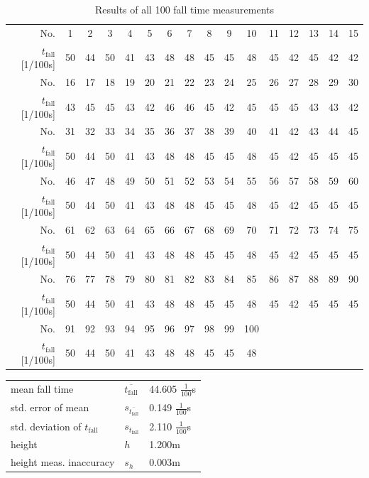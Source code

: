 \documentclass{scrreprt}
\begin{document}
\begin{table}[H]
\center
    \begin{tabular}{|r||ccccccccccccccc|}
    \hline
                          No. & 1  & 2  & 3  & 4  & 5  & 6  & 7  & 8  & 9  & 10 & 11 & 12 & 13 & 14 & 15\\
    $t_{\text{fall}}$[1/100s] & 50 & 44 & 50 & 41 & 43 & 48 & 48 & 45 & 45 & 48 & 45 & 42 & 45 & 42 & 42\\
    \hline 
                          No. & 16 & 17 & 18 & 19 & 20 & 21 & 22 & 23 & 24 & 25 & 26 & 27 & 28 & 29 & 30\\
    $t_{\text{fall}}$[1/100s] & 43 & 45 & 45 & 43 & 42 & 46 & 46 & 45 & 42 & 45 & 45 & 45 & 43 & 43 & 42\\
    \hline
                          No. & 31 & 32 & 33 & 34 & 35 & 36 & 37 & 38 & 39 & 40 & 41 & 42 & 43 & 44 & 45\\
    $t_{\text{fall}}$[1/100s] & 50 & 44 & 50 & 41 & 43 & 48 & 48 & 45 & 45 & 48 & 45 & 42 & 45 & 45 & 45\\
    \hline                     
                          No. & 46 & 47 & 48 & 49 & 50 & 51 & 52 & 53 & 54 & 55 & 56 & 57 & 58 & 59 & 60\\
    $t_{\text{fall}}$[1/100s] & 50 & 44 & 50 & 41 & 43 & 48 & 48 & 45 & 45 & 48 & 45 & 42 & 45 & 45 & 45\\
    \hline                     
                          No. & 61 & 62 & 63 & 64 & 65 & 66 & 67 & 68 & 69 & 70 & 71 & 72 & 73 & 74 & 75\\
    $t_{\text{fall}}$[1/100s] & 50 & 44 & 50 & 41 & 43 & 48 & 48 & 45 & 45 & 48 & 45 & 42 & 45 & 45 & 45\\
    \hline
                          No. & 76 & 77 & 78 & 79 & 80 & 81 & 82 & 83 & 84 & 85 & 86 & 87 & 88 & 89 & 90\\
    $t_{\text{fall}}$[1/100s] & 50 & 44 & 50 & 41 & 43 & 48 & 48 & 45 & 45 & 48 & 45 & 42 & 45 & 45 & 45\\
    \hline
                          No. & 91 & 92 & 93 & 94 & 95 & 96 & 97 & 98 & 99 & 100&    &    &    &    &\\
    $t_{\text{fall}}$[1/100s] & 50 & 44 & 50 & 41 & 43 & 48 & 48 & 45 & 45 & 48 &    &    &    &    &\\
    \hline

    \end{tabular}
    \caption{Results of all 100 fall time measurements}
\end{table}


\begin{center}
    \begin{tabular}{l l l}
	mean fall time & $\overline{t_{\text{fall}}}$ & 44.605 $\frac{1}{100}$s\\
	std. error of mean & $s_{\overline{t_{\text{fall}}}}$ & 0.149 $\frac{1}{100}$s\\
	std. deviation of $t_{\text{fall}}$ & $s_{t_{\text{fall}}}$ & 2.110 $\frac{1}{100}$s\\
	height & $h$ & 1.200m\\
	height meas. inaccuracy & $s_h$ & 0.003m   
    \end{tabular}
\end{center}
\end{document}
